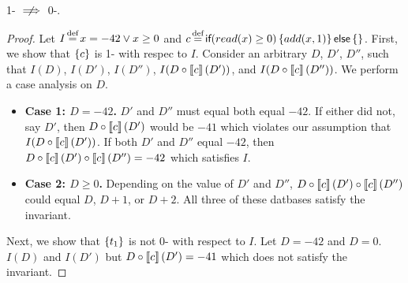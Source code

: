 \begin{claim}\label{clm:1-iconvergence-not-implies-0-isafety}
  1-\iconvergence{} $\centernot\implies$ 0-\isafety{}.
\end{claim}
\begin{proof}
  Let
    $I \defeq x = -42 \lor x \geq 0$ and
    $c \defeq \impif{read(x)\geq0}{add(x,1)}{}$.
  First, we show that $\left\{c\right\}$ is 1-\iconvergent{} with respec to $I$.
  Consider an arbitrary $D$,
    $D'$, $D''$, such that
    $I(D)$,
    $I(D')$,
    $I(D'')$,
    $I(D \circ \left\llbracket c\right\rrbracket(D'))$, and
    $I(D \circ \left\llbracket c\right\rrbracket(D''))$.
  We perform a case analysis on $D$.
  \begin{itemize}
    \item \textbf{Case 1: $D = -42$.}
      $D'$ and $D''$ must equal both equal $-42$. If either did not, say $D'$,
      then $D \circ \left\llbracket c\right\rrbracket(D')$ would be $-41$ which violates our
      assumption that $I(D \circ \left\llbracket c\right\rrbracket(D'))$. If both $D'$ and $D''$ equal
      $-42$, then $D \circ \left\llbracket c\right\rrbracket(D') \circ \left\llbracket c\right\rrbracket(D'') = -42$ which
      satisfies $I$.
    \item \textbf{Case 2: $D \geq 0$.}
      Depending on the value of $D'$ and $D''$, $D \circ \left\llbracket c\right\rrbracket(D') \circ
      \left\llbracket c\right\rrbracket(D'')$ could equal $D$, $D + 1$, or $D + 2$. All three of these
      datbases satisfy the invariant.
  \end{itemize}

  Next, we show that $\left\{t_1\right\}$ is not 0-\isafe{} with respect to $I$. Let $D
  = -42$ and $D = 0$. $I(D)$ and $I(D')$ but $D \circ \left\llbracket c\right\rrbracket(D') = -41$
  which does not satisfy the invariant.
\end{proof}

